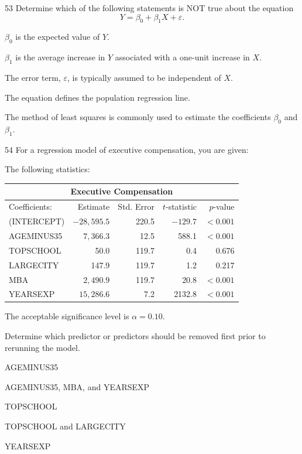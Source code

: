 \begin{question}{53}
Determine which of the following statements is NOT true about the equation
\[ Y = \beta_0 + \beta_1 X + \varepsilon. \]

\begin{choices}
\item $\beta_0$ is the expected value of $Y$.
\item $\beta_1$ is the average increase in $Y$ associated with a one-unit increase in $X$.
\item The error term, $\varepsilon$, is typically assumed to be independent of $X$.
\item The equation defines the population regression line.
\item The method of least squares is commonly used to estimate the coefficients $\beta_0$ and $\beta_1$.
\end{choices}
\end{question}

\begin{question}{54}
For a regression model of executive compensation, you are given:
\begin{given}
\item The following statistics:

\begin{center}
\begin{tabular}{|l|r|r|r|r|}
\hline
\multicolumn{5}{|c|}{Executive Compensation} \\ \hline
Coefficients: & Estimate & Std. Error & $t$-statistic & $p$-value \\ \hline
(INTERCEPT) & $-28{,}595.5$ & 220.5 & $-129.7$ & $<0.001$ \\ \hline
AGEMINUS35 & $7{,}366.3$ & 12.5 & 588.1 & $<0.001$ \\ \hline
TOPSCHOOL & 50.0 & 119.7 & 0.4 & 0.676 \\ \hline
LARGECITY & 147.9 & 119.7 & 1.2 & 0.217 \\ \hline
MBA & $2{,}490.9$ & 119.7 & 20.8 & $<0.001$ \\ \hline
YEARSEXP & $15{,}286.6$ & 7.2 & 2132.8 & $<0.001$ \\ \hline
\end{tabular}
\end{center}

\item The acceptable significance level is $\alpha = 0.10$.
\end{given}

Determine which predictor or predictors should be removed first prior to rerunning the model.

\begin{choices}
\item AGEMINUS35
\item AGEMINUS35, MBA, and YEARSEXP
\item TOPSCHOOL
\item TOPSCHOOL and LARGECITY
\item YEARSEXP
\end{choices}
\end{question}

